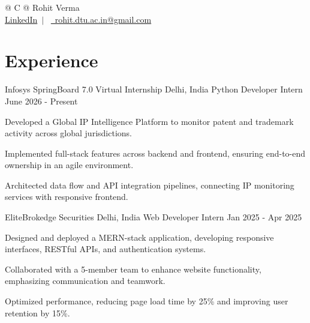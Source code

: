 \documentclass[a4paper,10pt]{article}
\begin{document}
\pagestyle{empty} 


\newcommand{\name}{Rohit Verma}
\newcommand{\emaila}{rohit.dtu.ac.in@gmail.com}
\newcommand{\linkedin}{\href{https://linkedin.com/in/rohit-verma-211rv}{LinkedIn}}

\begin{tabularx}{\linewidth}{@{} C @{}}
\Huge{\name}\\[7.5pt]

\linkedin \ $|$ \
\href{mailto:\emaila}{\raisebox{-0.05\height}\faEnvelope\ \emaila}
\end{tabularx}


\section{Experience}


\resumeSubheading
{Infosys SpringBoard 7.0 Virtual Internship}
{Delhi, India}
{Python Developer Intern}
{June 2026 - Present}

\resumeItemListStart
\item Developed a Global IP Intelligence Platform to monitor patent and trademark activity across global jurisdictions.
\item Implemented full-stack features across backend and frontend, ensuring end-to-end ownership in an agile environment.
\item Architected data flow and API integration pipelines, connecting IP monitoring services with responsive frontend.
\resumeItemListEnd

\vspace{-5pt}


\resumeSubheading
{EliteBrokedge Securities}
{Delhi, India}
{Web Developer Intern}
{Jan 2025 - Apr 2025}

\resumeItemListStart
\item Designed and deployed a MERN-stack application, developing responsive interfaces, RESTful APIs, and authentication systems.
\item Collaborated with a 5-member team to enhance website functionality, emphasizing communication and teamwork.
\item Optimized performance, reducing page load time by 25\% and improving user retention by 15\%.
\resumeItemListEnd
\end{document}
